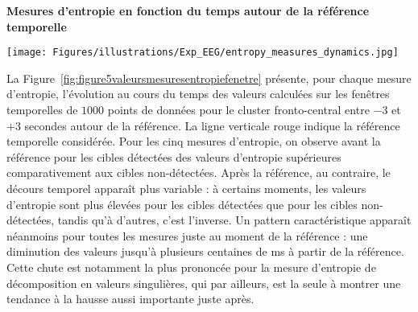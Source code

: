 \begin{figure*}[!t]
\centering \textbf{Mesures d'entropie en fonction du temps autour de la référence temporelle}\par\medskip
\texttt{[image: Figures/illustrations/Exp\_EEG/entropy\_measures\_dynamics.jpg]}
\caption[Valeurs des mesures d'entropie calculées pour les fenêtres temporelles dans le cluster FC]{Valeurs moyennes et barres d'erreur standard des mesures d'entropie calculées pour chacune des fenêtres de temps de $-3$ à $+3$ secondes, respectivement avant et après la référence temporelle (ligne rouge) pour le cluster fronto-central. Les mesures ont été estimées à partir de fenêtres de $1000$ points. Les points noirs montrent les fenêtres temporelles où une différence significative est observée entre la détection et la non-détection.}
\label{fig:figure5valeursmesuresentropiefenetre}
\end{figure*}

La Figure~\ref{fig:figure5valeursmesuresentropiefenetre} présente, pour chaque mesure d'entropie, l'évolution au cours du temps des valeurs calculées sur les fenêtres temporelles de $1000$ points de données pour le cluster fronto-central entre $-3$ et $+3$ secondes autour de la référence. 
La ligne verticale rouge indique la référence temporelle considérée. 
Pour les cinq mesures d'entropie, on observe avant la référence pour les cibles détectées des valeurs d'entropie supérieures comparativement aux cibles non-détectées. 
Après la référence, au contraire, le décours temporel apparaît plus variable : à certains moments, les valeurs d'entropie sont plus élevées pour les cibles détectées que pour les cibles non-détectées, tandis qu'à d'autres, c'est l'inverse. 
Un pattern caractéristique apparaît néanmoins pour toutes les mesures juste au moment de la référence : une diminution des valeurs jusqu'à plusieurs centaines de ms à partir de la référence. 
Cette chute est notamment la plus prononcée pour la mesure d'entropie de décomposition en valeurs singulières, qui par ailleurs, est la seule à montrer une tendance à la hausse aussi importante juste après. 

